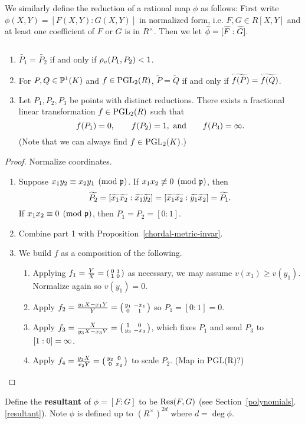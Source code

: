 We similarly define the reduction of a rational map $\phi$ as follows: 
First write $\phi(X,Y)=[F(X,Y):G(X,Y)]$ in normalized form, i.e. $F,G\in R[X,Y]$ and at least one coefficient of $F$ or $G$ is in $R^{\times}$. Then we let $\widetilde{\phi}=[\widetilde{F}:\widetilde{G}]$.
\begin{pr}$\,$
\begin{enumerate}
\item
$\widetilde{P_1}=\widetilde{P_2}$ if and only if $\rho_v(P_1,P_2)<1$.
\item
For $P,Q\in \mathbb{P}^1(K)$ and $f\in \operatorname{PGL}_2(R)$, $\widetilde{P}=\widetilde{Q}$ if and only if $\widetilde{f(P)}=\widetilde{f(Q)}$.
\item Let $P_1,P_2,P_3$ be points with distinct reductions. There exists a fractional linear transformation $f\in \operatorname{PGL}_2(R)$ such that 
\[
f(P_1)=0,\qquad f(P_2)=1, \text{ and}\qquad f(P_3)=\infty.
\]
(Note that we can always find $f\in \operatorname{PGL}_2(K)$.)
\end{enumerate}
\end{pr}
\begin{proof}Normalize coordinates. 
\begin{enumerate}
\item
Suppose $x_1y_2\equiv x_2y_1\pmod{\mathfrak{p}}$. If $x_1x_2\not\equiv 0\pmod{\mathfrak{p}}$, then 
\[
\widetilde{P_2}=[\widetilde{x_1}\widetilde{x_2}:\widetilde{x_1}\widetilde{y_2}]
=[\widetilde{x_1}\widetilde{x_2}:\widetilde{y_1}\widetilde{x_2}]=\widetilde{P_1}.
\]
If $x_1x_2\equiv 0\pmod{\mathfrak{p}}$, then $P_1=P_2=[0:1]$.
\item Combine part 1 with Proposition~\ref{chordal-metric-invar}.
\item We build $f$ as a composition of the following.
\begin{enumerate}
\item
Applying $f_1=\frac YX=\left(\begin{smallmatrix} {0}&{1}\\ {1}&{0} \end{smallmatrix}\right)$ as necessary, we may assume $v(x_1)\ge v(y_1)$. Normalize again so $v(y_1)=0$.
\item
Apply $f_2=\frac{y_1X-x_1Y}{Y}=\left(\begin{smallmatrix} {y_1}&{-x_1}\\ {0}&{1} \end{smallmatrix}\right)$ so $P_1=[0:1]=0$.
\item
Apply $f_3=\frac{X}{y_3X-x_3Y}=\left(\begin{smallmatrix} {1}&{0}\\ {y_3}&{-x_3} \end{smallmatrix}\right)$, which fixes $P_1$ and send $P_3$ to $[1:0]=\infty$.
\item
Apply $f_4=\frac{y_2X}{x_2Y}=\left(\begin{smallmatrix} {y_2}&{0}\\ {0}&{x_2} \end{smallmatrix}\right)$ to scale $P_2$. (Map in PGL(R)?)\qedhere
\end{enumerate}
\end{enumerate}
\end{proof}
Define the \textbf{resultant} of $\phi=[F:G]$ to be $\operatorname{Res}(F,G)$ (see Section~\ref{polynomials}.\ref{resultant}). Note $\phi$ is defined up to $(R^{\times})^{2d}$ where $d=\deg \phi$.
